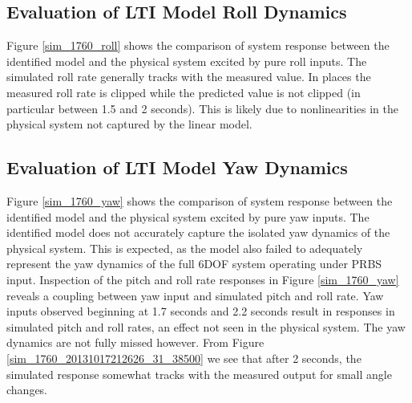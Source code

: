 \subsection{Evaluation of LTI Model Roll Dynamics}
Figure \ref{sim_1760_roll} shows the comparison of system response between the identified model and the physical system excited by pure roll inputs. The simulated roll rate generally tracks with the measured value. In places the measured roll rate is clipped while the predicted value is not clipped (in particular between 1.5 and 2 seconds). This is likely due to nonlinearities in the physical system not captured by the linear model.


\subsection{Evaluation of LTI Model Yaw Dynamics}
Figure \ref{sim_1760_yaw} shows the comparison of system response between the identified model and the physical system excited by pure yaw inputs. The identified model does not accurately capture the isolated yaw dynamics of the physical system. This is expected, as the model also failed to adequately represent the yaw dynamics of the full 6DOF system operating under PRBS input. Inspection of the pitch and roll rate responses in Figure \ref{sim_1760_yaw} reveals a coupling between yaw input and simulated pitch and roll rate. Yaw inputs observed beginning at 1.7 seconds and 2.2 seconds result in responses in simulated pitch and roll rates, an effect not seen in the physical system. The yaw dynamics are not fully missed however. From Figure \ref{sim_1760_20131017212626_31_38500} we see that after 2 seconds, the simulated response somewhat tracks with the measured output for small angle changes.







